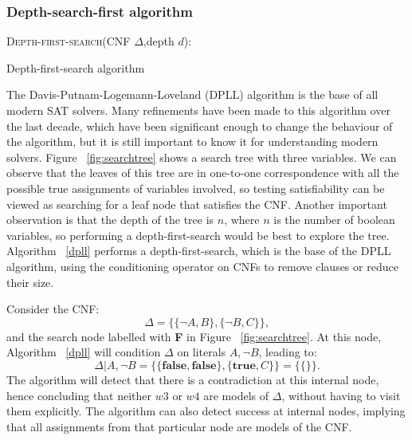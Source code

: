 \documentclass[12pt]{diicc}
\begin{document}
\subsubsection{Depth-search-first algorithm}

\begin{algorithm}
\textsc{Depth-first-search}(CNF $\Delta$,depth $d$):\\
\caption{Depth-first-search algorithm\label{dpll}}
\end{algorithm}    

The Davis-Putnam-Logemann-Loveland (DPLL) \cite{dpll} algorithm is the base of all modern SAT solvers. Many refinements have been made to this algorithm over the last decade, which have been significant enough to change the behaviour of the algorithm, but it is still important to know it for understanding modern solvers. Figure ~\ref{fig:searchtree} shows a search tree with three variables. We can observe that the leaves of this tree are in one-to-one correspondence with all the possible true assignments of variables involved, so testing satisfiability can be viewed as searching for a leaf node that satisfies the CNF. Another important observation is that the depth of the tree is $n$, where $n$ is the number of boolean variables, so performing a depth-first-search would be best to explore the tree. Algorithm ~\ref{dpll} performs a depth-first-search, which is the base of the DPLL algorithm, using the conditioning operator on CNFs to remove clauses or reduce their size.

Consider the CNF:
\[\Delta=\{\{\neg A,B\},\{\neg B,C\}\},\]
and the search node labelled with \textbf{F} in Figure ~\ref{fig:searchtree}. At this node, Algorithm ~\ref{dpll} will condition $\Delta$ on literals $A,\neg B$, leading to:
\[\Delta |A,\neg B=\{ \{\textbf{false},\textbf{false}\},\{\textbf{true},C\}\}=\{\{\}\}.\]
The algorithm will detect that there is a contradiction at this internal node, hence concluding that neither $w3$ or $w4$ are models of $\Delta$, without having to visit them explicitly. The algorithm can also detect success at internal nodes, implying that all assignments from that particular node are models of the CNF.
\end{document}
